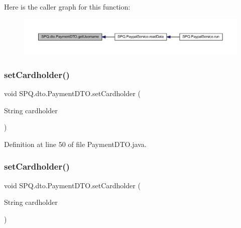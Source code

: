 Here is the caller graph for this function\+:\nopagebreak
\begin{figure}[H]
\begin{center}
\leavevmode
\includegraphics[width=350pt]{class_s_p_q_1_1dto_1_1_payment_d_t_o_a31d0edbb3ec64b406e70cd3deaa5ab1a_icgraph}
\end{center}
\end{figure}
\mbox{\label{class_s_p_q_1_1dto_1_1_payment_d_t_o_a5eea0a93b97ba73b36358c6f5e0ca42e}} 
\subsubsection{\texorpdfstring{set\+Cardholder()}{setCardholder()}\hspace{0.1cm}{\footnotesize\ttfamily [1/3]}}
{\footnotesize\ttfamily void S\+P\+Q.\+dto.\+Payment\+D\+T\+O.\+set\+Cardholder (\begin{DoxyParamCaption}\item[{String}]{cardholder }\end{DoxyParamCaption})}



Definition at line 50 of file Payment\+D\+T\+O.\+java.

\mbox{\label{class_s_p_q_1_1dto_1_1_payment_d_t_o_a5eea0a93b97ba73b36358c6f5e0ca42e}} 
\subsubsection{\texorpdfstring{set\+Cardholder()}{setCardholder()}\hspace{0.1cm}{\footnotesize\ttfamily [2/3]}}
{\footnotesize\ttfamily void S\+P\+Q.\+dto.\+Payment\+D\+T\+O.\+set\+Cardholder (\begin{DoxyParamCaption}\item[{String}]{cardholder }\end{DoxyParamCaption})}



